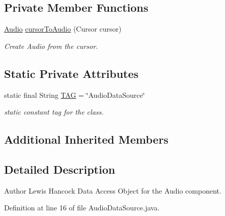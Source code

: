 \subsection*{Private Member Functions}
\begin{DoxyCompactItemize}
\item 
\hyperlink{classuk_1_1ac_1_1swan_1_1digitaltrails_1_1components_1_1_audio}{Audio} \hyperlink{classuk_1_1ac_1_1swan_1_1digitaltrails_1_1database_1_1_audio_data_source_a863754d0b9b837003d7138467952b1cb}{cursor\+To\+Audio} (Cursor cursor)
\begin{DoxyCompactList}\small\item\em Create Audio from the cursor. \end{DoxyCompactList}\end{DoxyCompactItemize}
\subsection*{Static Private Attributes}
\begin{DoxyCompactItemize}
\item 
static final String \hyperlink{classuk_1_1ac_1_1swan_1_1digitaltrails_1_1database_1_1_audio_data_source_aba39b0e1f15dae42786a0094543efc05}{T\+A\+G} = \char`\"{}Audio\+Data\+Source\char`\"{}
\begin{DoxyCompactList}\small\item\em static constant tag for the class. \end{DoxyCompactList}\end{DoxyCompactItemize}
\subsection*{Additional Inherited Members}


\subsection{Detailed Description}
\begin{DoxyAuthor}{Author}
Lewis Hancock Data Access Object for the Audio component. 
\end{DoxyAuthor}


Definition at line 16 of file Audio\+Data\+Source.\+java.



